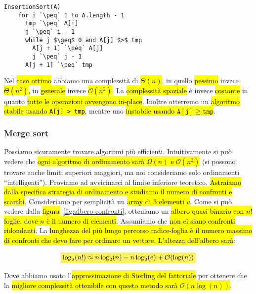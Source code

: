 \documentclass[a4paper,11pt,oneside]{article}
\theoremstyle{plain}
\theoremstyle{definition}
\theoremstyle{remark}
\newcommand{\mhl}[1]{\colorbox{hlcolor}{$\displaystyle #1$}}
\newcommand{\peq}{$\gets$}
\begin{document}
\begin{lstlisting}[language=pseudocodice,gobble=2]
  InsertionSort(A)
    for i `\peq` 1 to A.length - 1
      tmp `\peq` A[i]
      j `\peq` i - 1
      while j $\geq$ 0 and A[j] $>$ tmp
        A[j + 1] `\peq` A[j]
        j `\peq` j - 1
      A[j + 1] `\peq` tmp
\end{lstlisting}

Nel \hl{caso ottimo} abbiamo una complessità di \hl{$\Theta(n)$}, in quello
\hl{pessimo} invece \hl{$\Theta(n^2)$}, in \hl{generale} invece
\hl{$\mathcal{O}(n^2)$}. La \hl{complessità spaziale} è invece \hl{costante} in
quanto \hl{tutte le operazioni avvengono in-place}. Inoltre otterremo un
\hl{algoritmo stabile usando \texttt{A[j] > tmp}}, mentre uno \hl{instabile
usando $\mathtt{A[j]} \geq \mathtt{tmp}$}.

\subsubsection{Merge sort}\label{sec:merge-sort}

Possiamo sicuramente trovare algoritmi più efficienti. Intuitivamente si può
vedere che \hl{ogni algoritmo di ordinamento sarà $\Omega(n)$ e
$\mathcal{O}(n^2)$} (si possono trovare anche limiti superiori maggiori, ma noi
consideriamo solo ordinamenti ``intelligenti''). Proviamo ad avvicinarci al
limite inferiore teoretico. \hl{Astraiamo dalla specifica strategia di
ordinamento e studiamo il numero di confronti e scambi}. Consideriamo per
semplicità un \hl{array di $3$ elementi $v$}. Come si può vedere dalla
\hl{figura}~\ref{fig:albero-confronti}, otteniamo un \hl{albero quasi binario
con $n!$ foglie, dove $n$ è il numero di elementi}. Assumiamo che \hl{non ci %
siano confronti ridondanti}. La \hl{lunghezza del più lungo percorso
radice-foglia è il numero massimo di confronti che devo fare per ordinare un
vettore. L'altezza dell'albero sarà}:

\begin{equation}
  \mhl{
    \log_2(n!) \approx n\log_2(n) - n\log_2(e) + \mathcal{O}(\log(n))
  }
\end{equation}

Dove abbiamo usato l'\hl{approssimazione di Sterling del fattoriale} per
ottenere che la \hl{migliore complessità ottenibile con questo metodo sarà
$\mathcal{O}(n\log(n))$}.
\end{document}
